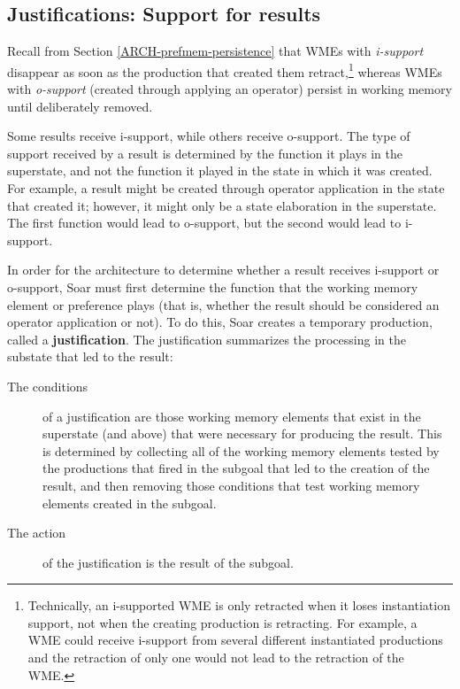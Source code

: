 \subsection{Justifications: Support for results}

Recall from Section \ref{ARCH-prefmem-persistence} that WMEs with \textit{i-support} disappear as soon as the production that created them retract,\footnote{
	Technically, an i-supported WME is only retracted when it loses instantiation support, not when the creating production is retracting. For example, a WME could receive i-support from several different instantiated productions and the retraction of only one would not lead to the retraction of the WME.} 
whereas WMEs with \textit{o-support} (created through applying an operator) persist in working memory until deliberately removed.

Some results receive i-support, while others receive o-support.  The type of support received by a result is determined by the function it plays in the superstate, and not the function it played in the state in which it was created. For example, a result might be created through operator application in the state that created it; however, it might only be a state elaboration in the superstate. The first function would lead to o-support, but the second would lead to i-support.

In order for the architecture to determine whether a result receives i-support or o-support, Soar must first determine the function that the working memory element or preference plays (that is, whether the result should be considered an operator application or not). To do this, Soar creates a temporary production, called a \textbf{justification}. The justification summarizes the processing in the substate that led to the result:

\vspace{-10pt}
\begin{description}
	\item[The conditions] of a justification are those working memory elements that exist in the superstate (and above) that were necessary for producing the result.  This is determined by collecting all of the working memory elements tested by the productions that fired in the subgoal that led to the creation of the result, and then removing those conditions that test working memory elements created in the subgoal.
	\vspace{-6pt}
	\item[The action] of the justification is the result of the subgoal.
\end{description} 

